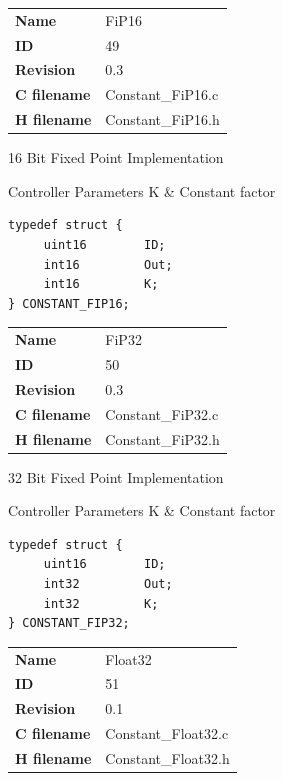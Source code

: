 \ifdefined \AddTestReports
{}
\fi
{}
\nopagebreak[0]
\begin{tabular}{l l}
\textbf{Name} & FiP16 \tabularnewline
\textbf{ID} & 49 \tabularnewline
\textbf{Revision} & 0.3 \tabularnewline
\textbf{C filename} & Constant\_FiP16.c \tabularnewline
\textbf{H filename} & Constant\_FiP16.h \tabularnewline
\end{tabular}
\vspace{1ex}

16 Bit Fixed Point Implementation

\begin{XtoCtabular}{Controller Parameters}
K & Constant factor\tabularnewline
\hline
\end{XtoCtabular}

\begin{lstlisting}
typedef struct {
     uint16        ID;
     int16         Out;
     int16         K;
} CONSTANT_FIP16;
\end{lstlisting}

\ifdefined \AddTestReports
{}
\fi
{}
\nopagebreak[0]
\begin{tabular}{l l}
\textbf{Name} & FiP32 \tabularnewline
\textbf{ID} & 50 \tabularnewline
\textbf{Revision} & 0.3 \tabularnewline
\textbf{C filename} & Constant\_FiP32.c \tabularnewline
\textbf{H filename} & Constant\_FiP32.h \tabularnewline
\end{tabular}
\vspace{1ex}

32 Bit Fixed Point Implementation

\begin{XtoCtabular}{Controller Parameters}
K & Constant factor\tabularnewline
\hline
\end{XtoCtabular}

\begin{lstlisting}
typedef struct {
     uint16        ID;
     int32         Out;
     int32         K;
} CONSTANT_FIP32;
\end{lstlisting}

\ifdefined \AddTestReports
{}
\fi
{}
\nopagebreak[0]
\begin{tabular}{l l}
\textbf{Name} & Float32 \tabularnewline
\textbf{ID} & 51 \tabularnewline
\textbf{Revision} & 0.1 \tabularnewline
\textbf{C filename} & Constant\_Float32.c \tabularnewline
\textbf{H filename} & Constant\_Float32.h \tabularnewline
\end{tabular}
\vspace{1ex}

